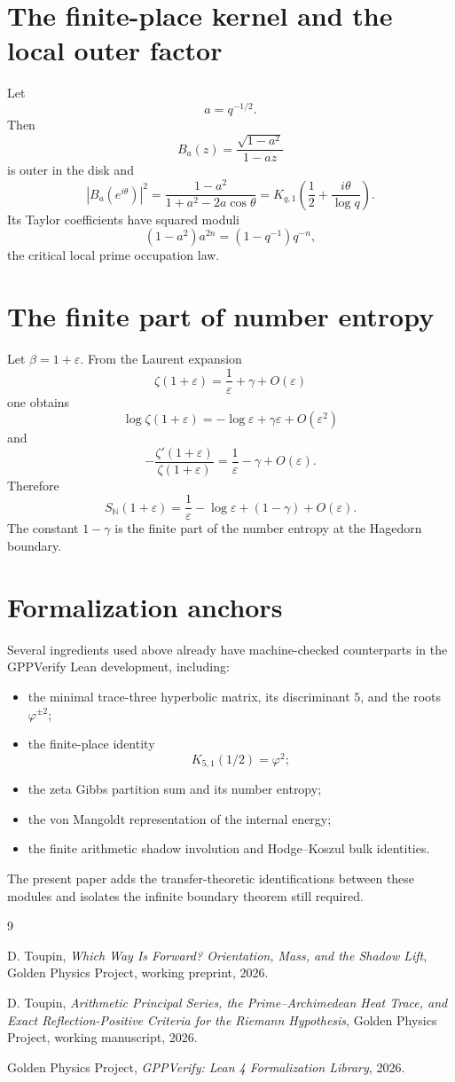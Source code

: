 \documentclass[11pt]{article}
\theoremstyle{definition}
\theoremstyle{remark}
\newcommand{\eps}{\varepsilon}
\begin{document}
\appendix

\section{The finite-place kernel and the local outer factor}

Let
\[
a=q^{-1/2}.
\]
Then
\[
B_a(z)
=
\frac{\sqrt{1-a^2}}{1-az}
\]
is outer in the disk and
\[
|B_a(e^{i\theta})|^2
=
\frac{1-a^2}{1+a^2-2a\cos\theta}
=
K_{q,1}\!\left(\frac12+\frac{i\theta}{\log q}\right).
\]
Its Taylor coefficients have squared moduli
\[
(1-a^2)a^{2n}
=
(1-q^{-1})q^{-n},
\]
the critical local prime occupation law.

\section{The finite part of number entropy}

Let \(\beta=1+\eps\).  From the Laurent expansion
\[
\zeta(1+\eps)
=
\frac1\eps+\gamma+O(\eps)
\]
one obtains
\[
\log\zeta(1+\eps)
=
-\log\eps+\gamma\eps+O(\eps^2)
\]
and
\[
-\frac{\zeta'(1+\eps)}{\zeta(1+\eps)}
=
\frac1\eps-\gamma+O(\eps).
\]
Therefore
\[
\boxed{
S_{\mathbb N}(1+\eps)
=
\frac1\eps-\log\eps+(1-\gamma)+O(\eps).
}
\]
The constant \(1-\gamma\) is the finite part of the number entropy at the Hagedorn boundary.

\section{Formalization anchors}

Several ingredients used above already have machine-checked counterparts in the GPPVerify Lean development, including:
\begin{itemize}
\item the minimal trace-three hyperbolic matrix, its discriminant \(5\), and the roots \(\varphi^{\pm2}\);
\item the finite-place identity
\[
K_{5,1}(1/2)=\varphi^2;
\]
\item the zeta Gibbs partition sum and its number entropy;
\item the von Mangoldt representation of the internal energy;
\item the finite arithmetic shadow involution and Hodge--Koszul bulk identities.
\end{itemize}
The present paper adds the transfer-theoretic identifications between these modules and isolates the infinite boundary theorem still required.

\begin{thebibliography}{9}

D. Toupin,
\emph{Which Way Is Forward? Orientation, Mass, and the Shadow Lift},
Golden Physics Project, working preprint, 2026.

D. Toupin,
\emph{Arithmetic Principal Series, the Prime--Archimedean Heat Trace, and Exact Reflection-Positive Criteria for the Riemann Hypothesis},
Golden Physics Project, working manuscript, 2026.

Golden Physics Project,
\emph{GPPVerify: Lean 4 Formalization Library},
2026.

\end{thebibliography}
\end{document}
